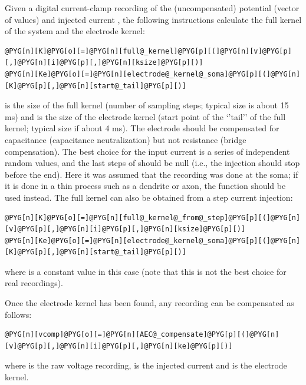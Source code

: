 \documentclass[letterpaper,10pt,english]{manual}
\begin{document}
Given a digital current-clamp recording of the (uncompensated) potential 
(vector of values) and injected current , the following instructions
calculate the full kernel of the system and the electrode kernel:

\begin{Verbatim}[commandchars=@\[\]]
@PYG[n][K]@PYG[o][=]@PYG[n][full@_kernel]@PYG[p][(]@PYG[n][v]@PYG[p][,]@PYG[n][i]@PYG[p][,]@PYG[n][ksize]@PYG[p][)]
@PYG[n][Ke]@PYG[o][=]@PYG[n][electrode@_kernel@_soma]@PYG[p][(]@PYG[n][K]@PYG[p][,]@PYG[n][start@_tail]@PYG[p][)]
\end{Verbatim}

 is the size of the full kernel (number of sampling steps; typical size is
about 15 ms) and  is the size of the electrode kernel (start point
of the `'tail'' of the full kernel; typical size if about 4 ms). The electrode
should be compensated for capacitance (capacitance neutralization)
but not resistance (bridge compensation). The best choice for the
input current is a series of independent random values, and the last 
steps of  should be null (i.e., the injection should stop before the end).
Here it was assumed that the recording was done at the soma; if it is done in a thin
process such as a dendrite or axon, the function 
should be used instead. The full kernel can also be obtained from a step current
injection:

\begin{Verbatim}[commandchars=@\[\]]
@PYG[n][K]@PYG[o][=]@PYG[n][full@_kernel@_from@_step]@PYG[p][(]@PYG[n][v]@PYG[p][,]@PYG[n][i]@PYG[p][,]@PYG[n][ksize]@PYG[p][)]
@PYG[n][Ke]@PYG[o][=]@PYG[n][electrode@_kernel@_soma]@PYG[p][(]@PYG[n][K]@PYG[p][,]@PYG[n][start@_tail]@PYG[p][)]
\end{Verbatim}

where  is a constant value in this case (note that this is not the best choice for
real recordings).

Once the electrode kernel has been found, any recording can be compensated as follows:

\begin{Verbatim}[commandchars=@\[\]]
@PYG[n][vcomp]@PYG[o][=]@PYG[n][AEC@_compensate]@PYG[p][(]@PYG[n][v]@PYG[p][,]@PYG[n][i]@PYG[p][,]@PYG[n][ke]@PYG[p][)]
\end{Verbatim}

where  is the raw voltage recording,  is the injected current
and  is the electrode kernel.
\end{document}
